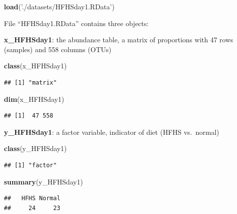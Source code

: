 \documentclass[openany]{book}
\newenvironment{Shaded}{\begin{snugshade}}{\end{snugshade}}
\newcommand{\KeywordTok}[1]{\textcolor[rgb]{0.13,0.29,0.53}{\textbf{#1}}}
\newcommand{\StringTok}[1]{\textcolor[rgb]{0.31,0.60,0.02}{#1}}
\newcommand{\NormalTok}[1]{#1}
\begin{document}
\begin{Shaded}
\begin{Highlighting}[]
\KeywordTok{load}\NormalTok{(}\StringTok{'./datasets/HFHSday1.RData'}\NormalTok{)}
\end{Highlighting}
\end{Shaded}

File ``HFHSday1.RData'' contains three objects:

\textbf{x\_HFHSday1}: the abundance table, a matrix of proportions with
47 rows (samples) and 558 columns (OTUs)

\begin{Shaded}
\begin{Highlighting}[]
\KeywordTok{class}\NormalTok{(x_HFHSday1)}
\end{Highlighting}
\end{Shaded}

\begin{verbatim}
## [1] "matrix"
\end{verbatim}

\begin{Shaded}
\begin{Highlighting}[]
\KeywordTok{dim}\NormalTok{(x_HFHSday1)}
\end{Highlighting}
\end{Shaded}

\begin{verbatim}
## [1]  47 558
\end{verbatim}

\textbf{y\_HFHSday1}: a factor variable, indicator of diet (HFHS
vs.~normal)

\begin{Shaded}
\begin{Highlighting}[]
\KeywordTok{class}\NormalTok{(y_HFHSday1)}
\end{Highlighting}
\end{Shaded}

\begin{verbatim}
## [1] "factor"
\end{verbatim}

\begin{Shaded}
\begin{Highlighting}[]
\KeywordTok{summary}\NormalTok{(y_HFHSday1)}
\end{Highlighting}
\end{Shaded}

\begin{verbatim}
##   HFHS Normal 
##     24     23
\end{verbatim}
\end{document}
